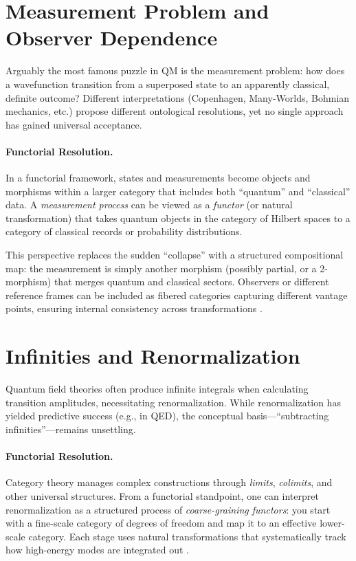 \documentclass[12pt]{article}
\begin{document}
\vspace{1em}

\section{Measurement Problem and Observer Dependence}
Arguably the most famous puzzle in QM is the measurement problem: how does a wavefunction transition from a superposed state to an apparently classical, definite outcome? Different interpretations (Copenhagen, Many-Worlds, Bohmian mechanics, etc.) propose different ontological resolutions, yet no single approach has gained universal acceptance.

\paragraph{Functorial Resolution.}
In a functorial framework, states and measurements become objects and morphisms within a larger category that includes both ``quantum'' and ``classical'' data. A \emph{measurement process} can be viewed as a \emph{functor} (or natural transformation) that takes quantum objects in the category of Hilbert spaces to a category of classical records or probability distributions. 

This perspective replaces the sudden ``collapse'' with a structured compositional map: the measurement is simply another morphism (possibly partial, or a 2-morphism) that merges quantum and classical sectors. Observers or different reference frames can be included as fibered categories capturing different vantage points, ensuring internal consistency across transformations \cite{CoeckeQuantum}.

\vspace{1em}

\section{Infinities and Renormalization}
Quantum field theories often produce infinite integrals when calculating transition amplitudes, necessitating renormalization. While renormalization has yielded predictive success (e.g., in QED), the conceptual basis---``subtracting infinities''---remains unsettling. 

\paragraph{Functorial Resolution.}
Category theory manages complex constructions through \emph{limits}, \emph{colimits}, and other universal structures. From a functorial standpoint, one can interpret renormalization as a structured process of \emph{coarse-graining functors}: you start with a fine-scale category of degrees of freedom and map it to an effective lower-scale category. Each stage uses natural transformations that systematically track how high-energy modes are integrated out \cite{HeunenVicary, FreedHopkinsLurie}.
\end{document}
